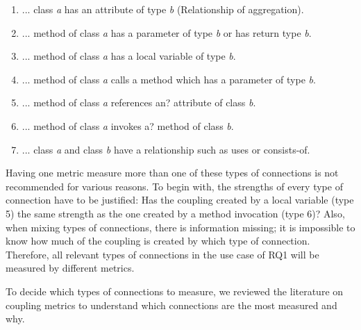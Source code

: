 \begin{enumerate}
  \item ... class \textit{a} has an attribute of type \textit{b} (Relationship of aggregation).
  \item ... method of class \textit{a} has a parameter of type \textit{b} or has return type \textit{b}.
  \item ... method of class \textit{a} has a local variable of type \textit{b}.
  \item ... method of class \textit{a} calls a method which has a parameter of type \textit{b}.
  \item ... method of class \textit{a} references an? attribute of class \textit{b}.
  \item ... method of class \textit{a} invokes a? method of class \textit{b}.
  \item ... class \textit{a} and class \textit{b} have a relationship such as uses or consists-of.
\end{enumerate}

Having one metric measure more than one of these types of connections is not recommended for various reasons. To begin with, the strengths of every type of connection have to be justified: Has the coupling created by a local variable (type 5) the same strength as the one created by a method invocation (type 6)? Also, when mixing types of connections, there is information missing; it is impossible to know how much of the coupling is created by which type of connection. Therefore, all relevant types of connections in the use case of RQ1 will be measured by different metrics.

To decide which types of connections to measure, we reviewed the literature on coupling metrics to understand which connections are the most measured and why.

